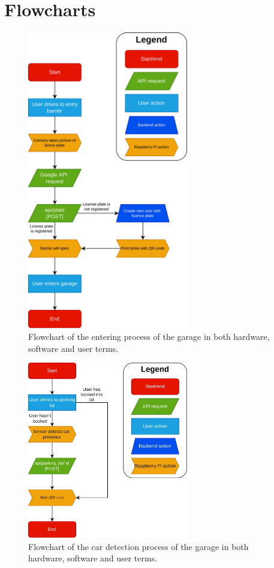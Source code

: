 \section{Flowcharts}\label{app:flowcharts}

\begin{figure}[htp]
    \centering
    \includegraphics[width=7cm]{images/flowcharts/garage_enter.drawio.png}
    \caption{Flowchart of the entering process of the garage in both hardware, software and user terms.}
    \label{fig:garage-enter}
\end{figure}

\begin{figure}[htp]
    \centering
    \includegraphics[width=7cm]{images/flowcharts/car_detection.drawio.png}
    \caption{Flowchart of the car detection process of the garage in both hardware, software and user terms.}
    \label{fig:car-detection}
\end{figure}

